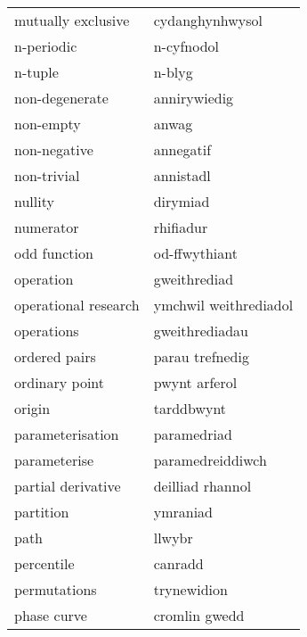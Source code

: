 \begin{supertabular}{p{0.22\textwidth}p{0.22\textwidth}}
               mutually exclusive &                  cydanghynhwysol \\
                       n-periodic &                       n-cyfnodol \\
                          n-tuple &                           n-blyg \\
                   non-degenerate &                     annirywiedig \\
                        non-empty &                            anwag \\
                     non-negative &                        annegatif \\
                      non-trivial &                        annistadl \\
                          nullity &                         dirymiad \\
                        numerator &                        rhifiadur \\
                     odd function &                    od-ffwythiant \\
                        operation &                     gweithrediad \\
             operational research &            ymchwil weithrediadol \\
                       operations &                   gweithrediadau \\
                    ordered pairs &                  parau trefnedig \\
                   ordinary point &                    pwynt arferol \\
                           origin &                       tarddbwynt \\
                 parameterisation &                      paramedriad \\
                     parameterise &                 paramedreiddiwch \\
               partial derivative &                 deilliad rhannol \\
                        partition &                         ymraniad \\
                             path &                           llwybr \\
                       percentile &                          canradd \\
                     permutations &                      trynewidion \\
                      phase curve &                    cromlin gwedd \\

\end{supertabular}
